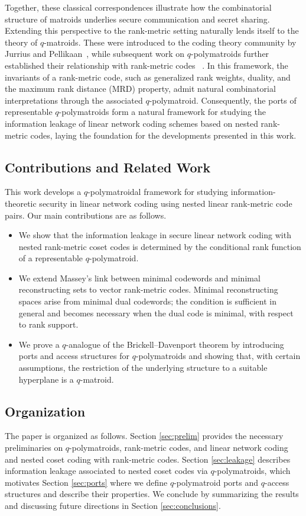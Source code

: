 \documentclass[onecolumn,draftclsnofoot,12pt]{IEEEtran}
\theoremstyle{plain} %
\theoremstyle{definition}
\begin{document}
Together, these classical correspondences illustrate how the combinatorial structure of matroids underlies secure communication and secret sharing. Extending this perspective to the rank-metric setting naturally lends itself to the theory of $q$-matroids. These were introduced to the coding theory community by Jurrius and Pellikaan~\cite{JurriusPellikaan2018}, while subsequent work on $q$-polymatroids further established their relationship with rank-metric codes ~\cite{Gorla_2019,DBLP:journals/corr/abs-2104-06570,Shiromoto}. In this framework, the invariants of a rank-metric code, such as generalized rank weights, duality, and the maximum rank distance (MRD) property, admit natural combinatorial interpretations through the associated $q$-polymatroid. Consequently, the ports of representable $q$-polymatroids form a natural framework for studying the information leakage of linear network coding schemes based on nested rank-metric codes, laying the foundation for the developments presented in this work.


\subsection{Contributions and Related Work}
This work develops a $q$-polymatroidal framework for studying information-theoretic security in linear network coding using nested linear rank-metric code pairs. Our main contributions are as follows.
\begin{itemize}
\item We show that the information leakage in secure linear network coding with nested rank-metric coset codes is determined by the conditional rank function of a representable $q$-polymatroid. 
\item We extend Massey’s link between minimal codewords and minimal reconstructing sets to vector rank-metric codes. Minimal reconstructing spaces arise from minimal dual codewords; the condition is sufficient in general and becomes necessary when the dual code is minimal, with respect to rank support.
\item We prove a $q$-analogue of the Brickell–Davenport theorem by introducing ports and access structures for $q$-polymatroids and showing that, with certain assumptions, the restriction of the underlying structure to a suitable hyperplane is a $q$-matroid.
\end{itemize}


\subsection{Organization}
The paper is organized as follows. Section \ref{sec:prelim} provides the necessary preliminaries on $q$-polymatroids, rank-metric codes, and linear network coding and nested coset coding with rank-metric codes. Section \ref{sec:leakage} describes information leakage associated to nested coset codes via $q$-polymatroids, which motivates Section \ref{sec:ports} where we define $q$-polymatroid ports and $q$-access structures and describe their properties. We conclude by summarizing the results and discussing future directions in Section \ref{sec:conclusions}.
\end{document}

